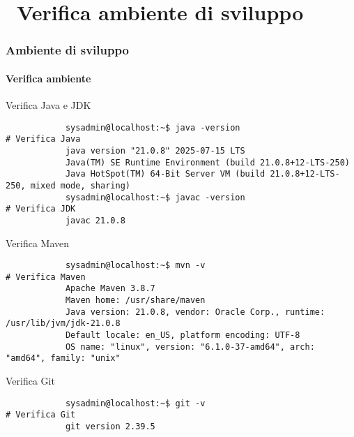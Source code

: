 \section{\faWrench\ Verifica ambiente di sviluppo} %
\label{sec:diy-check-dev-env}
%
\begin{frame}[t,fragile] \frametitle{Ambiente di sviluppo}
\framesubtitle{Verifica ambiente}
    \vspace*{-.5cm}
    \begin{shellcodeblock}{Verifica Java e JDK}
        \begin{verbatim}
            sysadmin@localhost:~$ java -version                          # Verifica Java
            java version "21.0.8" 2025-07-15 LTS
            Java(TM) SE Runtime Environment (build 21.0.8+12-LTS-250)
            Java HotSpot(TM) 64-Bit Server VM (build 21.0.8+12-LTS-250, mixed mode, sharing)
            sysadmin@localhost:~$ javac -version                         # Verifica JDK
            javac 21.0.8
        \end{verbatim}
    \end{shellcodeblock}
    \begin{shellcodeblock}{Verifica Maven}
        \begin{verbatim}
            sysadmin@localhost:~$ mvn -v                                 # Verifica Maven
            Apache Maven 3.8.7
            Maven home: /usr/share/maven
            Java version: 21.0.8, vendor: Oracle Corp., runtime: /usr/lib/jvm/jdk-21.0.8
            Default locale: en_US, platform encoding: UTF-8
            OS name: "linux", version: "6.1.0-37-amd64", arch: "amd64", family: "unix"
        \end{verbatim}
    \end{shellcodeblock}
    \begin{shellcodeblock}{Verifica Git}   
        \begin{verbatim}
            sysadmin@localhost:~$ git -v                                 # Verifica Git
            git version 2.39.5
        \end{verbatim}
    \end{shellcodeblock}
\end{frame}
%
